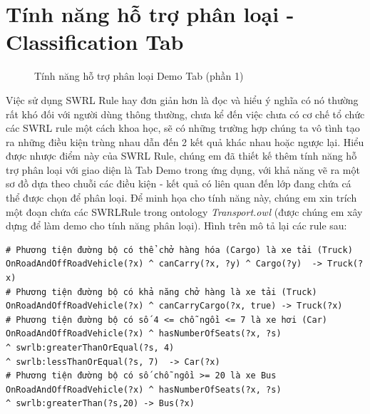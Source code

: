 \section{Tính năng hỗ trợ phân loại - Classification Tab}
\begin{figure}[ht!]
	\centering
	\caption{Tính năng hỗ trợ phân loại Demo Tab (phần 1)\label{overflow}}
\end{figure}
Việc sử dụng SWRL Rule hay đơn giản hơn là đọc và hiểu ý nghĩa có nó thường rất khó đối với người dùng thông thường, chưa kể đến việc chưa có cơ chế tổ chức các SWRL rule một cách khoa học, sẽ có những trường hợp chúng ta vô tình tạo ra những điều kiện trùng nhau dẫn đến 2 kết quả khác nhau hoặc ngược lại. Hiểu được nhược điểm này của SWRL Rule, chúng em đã thiết kế thêm tính năng hỗ trợ phân loại với giao diện là Tab Demo trong ứng dụng, với khả năng vẽ ra một sơ đồ dựa theo chuỗi các điều kiện - kết quả có liên quan đến lớp đang chứa cá thể được chọn để phân loại. Để minh họa cho tính năng này, chúng em xin trích một đoạn chứa các SWRLRule trong ontology \textit{Transport.owl} \cite{owleditorSrc} (được chúng em xây dựng để làm demo cho tính năng phân loại). Hình trên mô tả lại các rule sau:
\begin{verbatim}
# Phương tiện đường bộ có thể chở hàng hóa (Cargo) là xe tải (Truck)
OnRoadAndOffRoadVehicle(?x) ^ canCarry(?x, ?y) ^ Cargo(?y)  -> Truck(?x)
# Phương tiện đường bộ có khả năng chở hàng là xe tải (Truck)
OnRoadAndOffRoadVehicle(?x) ^ canCarryCargo(?x, true) -> Truck(?x)
# Phương tiện đường bộ có số 4 <= chỗ ngồi <= 7 là xe hơi (Car)
OnRoadAndOffRoadVehicle(?x) ^ hasNumberOfSeats(?x, ?s)
^ swrlb:greaterThanOrEqual(?s, 4) 
^ swrlb:lessThanOrEqual(?s, 7)  -> Car(?x)
# Phương tiện đường bộ có số chỗ ngồi >= 20 là xe Bus 
OnRoadAndOffRoadVehicle(?x) ^ hasNumberOfSeats(?x, ?s) 
^ swrlb:greaterThan(?s,20) -> Bus(?x)                               
\end{verbatim}
